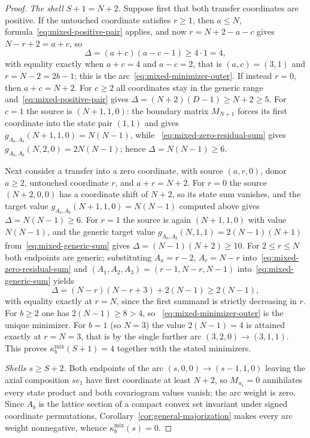 \documentclass[pdflatex,sn-mathphys-num]{sn-jnl}
\theoremstyle{thmstyleone}
\theoremstyle{thmstylethree}
\theoremstyle{thmstyletwo}
\begin{document}
\begin{proof}
\emph{The shell $S+1=N+2$.}  Suppose first that both transfer coordinates
are positive.  If the untouched coordinate satisfies $r\ge1$, then
$a\le N$, formula~\eqref{eq:mixed-positive-pair} applies, and now
$r=N+2-a-c$ gives $N-r+2=a+c$, so
\begin{equation}
 \Delta=(a+c)(a-c-1)\ge4\cdot1=4,                    \label{eq:mixed-outer-generic}
\end{equation}
with equality exactly when $a+c=4$ and $a-c=2$, that is $(a,c)=(3,1)$ and
$r=N-2=2b-1$; this is the arc~\eqref{eq:mixed-minimizer-outer}.  If instead
$r=0$, then $a+c=N+2$.  For $c\ge2$ all coordinates stay in the generic
range and~\eqref{eq:mixed-positive-pair} gives
$\Delta=(N+2)(D-1)\ge N+2\ge5$.  For $c=1$ the source is $(N+1,1,0)$: the
boundary matrix $M_{N+1}$ forces its first coordinate into the state pair
$(1,1)$ and gives $g_{A_b,A_b}(N+1,1,0)=N(N-1)$, while
~\eqref{eq:mixed-zero-residual-sum} gives $g_{A_b,A_b}(N,2,0)=2N(N-1)$;
hence $\Delta=N(N-1)\ge6$.

Next consider a transfer into a zero coordinate, with source $(a,r,0)$,
donor $a\ge2$, untouched coordinate $r$, and $a+r=N+2$.  For $r=0$ the source
$(N+2,0,0)$ has a coordinate shift of $N+2$, so its state sum vanishes, and
the target value $g_{A_b,A_b}(N+1,1,0)=N(N-1)$ computed above gives
$\Delta=N(N-1)\ge6$.  For $r=1$ the source is again $(N+1,1,0)$ with value
$N(N-1)$, and the generic target value
$g_{A_b,A_b}(N,1,1)=2(N-1)(N+1)$ from~\eqref{eq:mixed-generic-sum} gives
$\Delta=(N-1)(N+2)\ge10$.  For $2\le r\le N$ both endpoints are generic;
substituting $A_a=r-2$, $A_r=N-r$ into~\eqref{eq:mixed-zero-residual-sum}
and $(A_1,A_2,A_3)=(r-1,N-r,N-1)$ into~\eqref{eq:mixed-generic-sum} yields
\begin{equation}
 \Delta=(N-r)(N-r+3)+2(N-1)\ge2(N-1),                \label{eq:mixed-outer-zero-recipient}
\end{equation}
with equality exactly at $r=N$, since the first summand is strictly
decreasing in $r$.  For $b\ge2$ one has $2(N-1)\ge8>4$, so
~\eqref{eq:mixed-minimizer-outer} is the unique minimizer.  For $b=1$
(so $N=3$) the value $2(N-1)=4$ is attained exactly at $r=N=3$, that is by
the single further arc $(3,2,0)\to(3,1,1)$.  This proves
$\kappa^{\mathrm{mix}}_b(S+1)=4$ together with the stated minimizers.

\emph{Shells $s\ge S+2$.}  Both endpoints of the arc
$(s,0,0)\to(s-1,1,0)$ leaving the axial composition $se_1$ have first
coordinate at least $N+2$, so $M_{u_1}=0$
annihilates every state product and both covariogram values vanish; the arc
weight is zero.  Since $A_b$ is the lattice section of a compact convex set
invariant under signed coordinate permutations,
Corollary~\ref{cor:general-majorization} makes every arc weight nonnegative,
whence $\kappa^{\mathrm{mix}}_b(s)=0$.
\end{proof}
\end{document}
